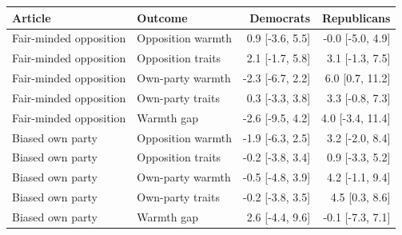 \begin{tabular}{llrr}
\toprule
Article & Outcome & Democrats & Republicans \\
\midrule
Fair-minded opposition & Opposition warmth & 0.9 [-3.6, 5.5] & -0.0 [-5.0, 4.9] \\
Fair-minded opposition & Opposition traits & 2.1 [-1.7, 5.8] & 3.1 [-1.3, 7.5] \\
Fair-minded opposition & Own-party warmth & -2.3 [-6.7, 2.2] & 6.0 [0.7, 11.2] \\
Fair-minded opposition & Own-party traits & 0.3 [-3.3, 3.8] & 3.3 [-0.8, 7.3] \\
Fair-minded opposition & Warmth gap & -2.6 [-9.5, 4.2] & 4.0 [-3.4, 11.4] \\
Biased own party & Opposition warmth & -1.9 [-6.3, 2.5] & 3.2 [-2.0, 8.4] \\
Biased own party & Opposition traits & -0.2 [-3.8, 3.4] & 0.9 [-3.3, 5.2] \\
Biased own party & Own-party warmth & -0.5 [-4.8, 3.9] & 4.2 [-1.1, 9.4] \\
Biased own party & Own-party traits & -0.2 [-3.8, 3.5] & 4.5 [0.3, 8.6] \\
Biased own party & Warmth gap & 2.6 [-4.4, 9.6] & -0.1 [-7.3, 7.1] \\
\bottomrule
\end{tabular}
